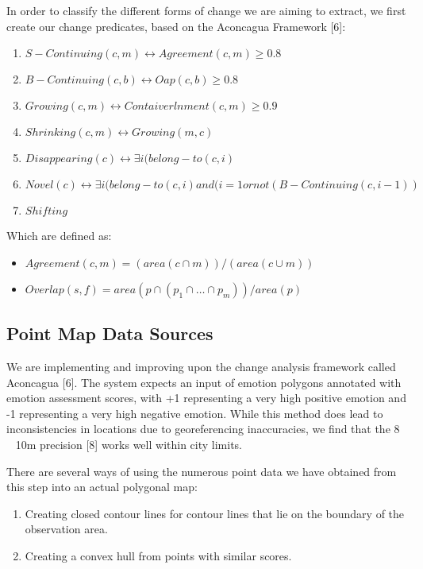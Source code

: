 \documentclass[conference]{IEEEtran}
\begin{document}
In order to classify the different forms of change we are aiming to extract, we first create our change predicates, based on the Aconcagua Framework [6]:

\begin{enumerate}
	\item $S-Continuing (c,m)  \leftrightarrow  Agreement (c,m) \geq 0.8$
	\item $B-Continuing(c,b)  \leftrightarrow  Oap (c,b) \geq 0.8$
	\item $Growing(c,m)  \leftrightarrow  Contaiverlnment (c,m) \geq 0.9 $
	\item $Shrinking(c,m) \leftrightarrow Growing (m,c)$
	\item $Disappearing(c) \leftrightarrow \exists i (belong-to(c,i) $
	\item $Novel (c) \leftrightarrow  \exists i (belong-to(c,i) and (i=1 or not(B-Continuing(c,i-1)) $
	\item $Shifting$

\end{enumerate}

Which are defined as:

\begin{itemize}
	\item $Agreement (c, m) = (area(c\cap m))/(area(c\cup m))$

	\item $Overlap(s,f)= area(p\cap (p_1\cap …\cap p_m))/area(p)$

\end{itemize}

\subsection{Point Map Data Sources}
We are implementing and improving upon the change analysis framework called Aconcagua [6]. The system expects an input of emotion polygons annotated with emotion assessment scores, with +1 representing a very high positive emotion and -1 representing a very high negative emotion. While this method does lead to inconsistencies in locations due to georeferencing inaccuracies, we find that the 8 ~ 10m precision [8] works well within city limits.

There are several ways of using the numerous point data we have obtained from this step into an actual polygonal map: 

\begin{enumerate}

\item Creating closed contour lines for contour lines that lie on the boundary of the observation area.
\item Creating a convex hull from points with similar scores.
\end{enumerate}
\end{document}
